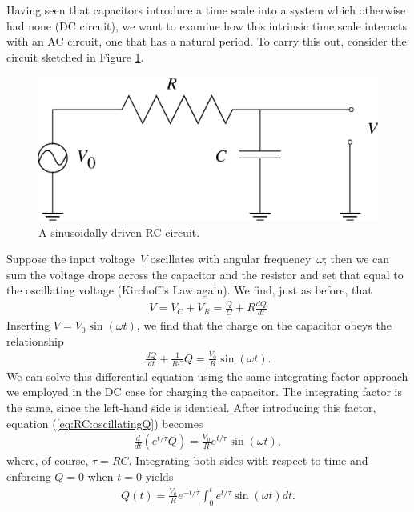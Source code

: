 Having seen that capacitors introduce a time scale into a system which 
otherwise had none (DC circuit), we want to examine how this intrinsic time
scale interacts with an AC circuit, one that has a natural period. To carry
this out, consider the circuit sketched in Figure 
\ref{fig:RC:driven rc circuit}. 
\begin{figure}[htb]
\centering 
\epsfxsize=8cm \includegraphics[scale=0.5]{5_rccircuits/rc2.eps}
\caption{A sinusoidally driven RC circuit.}
\label{fig:RC:driven rc circuit}
\end{figure}
Suppose the input voltage~$V$ oscillates with angular frequency~$\omega$; then
we can sum the voltage drops across the capacitor and the resistor and set that
equal to the oscillating voltage (Kirchoff's Law again). We find, just as 
before, that
\begin{eqnarray*}
V = V_C + V_R = \frac{Q}{C}+R\frac{dQ}{dt}
\end{eqnarray*}
Inserting $V = V_0 \sin (\omega t)$, we find that the charge on the capacitor 
obeys the relationship
\begin{eqnarray}
\frac{dQ}{dt} + \frac{1}{RC} Q = \frac{V_0}{R} \sin (\omega t).
   \label{eq:RC:oscillatingQ}
\end{eqnarray}
We can solve this differential equation using the same integrating factor
approach we employed in the DC case for charging the capacitor. The integrating
factor is the same, since the left-hand side is identical. After introducing 
this factor, equation (\ref{eq:RC:oscillatingQ}) becomes
\begin{eqnarray*}
\frac{d}{dt} \left( e^{t/\tau} Q \right) = \frac{V_0}{R} e^{t/\tau} \sin
(\omega t),
\end{eqnarray*}
where, of course, $\tau=RC$. Integrating both sides with respect to time and 
enforcing $Q=0$ when $t=0$ yields
\begin{eqnarray*}
Q(t) = \frac{V_0}{R} e^{-t/\tau} \int_0^t e^{t/\tau} \sin (\omega t) dt.
\end{eqnarray*}
